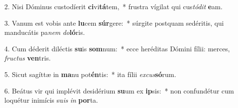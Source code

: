 2. Nisi Dóminus custodíerit \textbf{ci}vi\textbf{tá}tem,~*  frustra vígilat qui cus\textit{tó}\textit{dit} \textbf{e}am.\

3. Vanum est vobis ante \textbf{lu}cem \textbf{súr}gere:~*  súrgite postquam sedéritis, qui manducátis pa\textit{nem} \textit{do}\textbf{ló}ris.\

4. Cum déderit diléctis \textbf{su}is \textbf{som}num:~*  ecce heréditas Dómini fílii: merces, \textit{fruc}\textit{tus} \textbf{ven}tris.\

5. Sicut sagíttæ in \textbf{ma}nu pot\textbf{én}tis:~*  ita fílii \textit{ex}\textit{cus}\textbf{só}rum.\

6. Beátus vir qui implévit desidérium \textbf{su}um ex \textbf{ip}sis:~*  non confundétur cum loquétur inimícis su\textit{is} \textit{in} \textbf{por}ta.\

